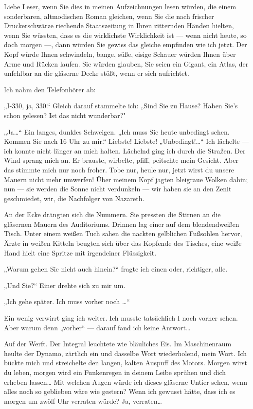 Liebe Leser, wenn Sie dies in meinen
Aufzeichnungen lesen würden, die einem sonderbaren, altmodischen
Roman gleichen, wenn Sie die nach frischer Druckerschwärze
riechende Staatszeitung in Ihren zitternden Händen hielten, wenn
Sie wüssten, dass es die wirklichste Wirklichkeit ist — wenn nicht
heute, so doch morgen —, dann würden Sie gewiss das gleiche
empfinden wie ich jetzt. Der Kopf würde Ihnen schwindeln, bange,
süße, eisige Schauer würden Ihnen über Arme und Rücken laufen. Sie
würden glauben, Sie seien ein Gigant, ein Atlas, der unfehlbar an
die gläserne Decke stößt, wenn er sich aufrichtet.

Ich nahm den Telefonhörer ab:

„I-330, ja, 330.“ Gleich darauf stammelte ich: „Sind Sie zu Hause?
Haben Sie's schon gelesen? Ist das nicht wunderbar?"

„Ja\ldots{}“ Ein langes, dunkles Schweigen. „Ich muss Sie heute
unbedingt sehen. Kommen Sie nach 16 Uhr zu mir.“ Liebste! Liebste!
„Unbedingt!\ldots{}“ Ich lächelte — ich konnte nicht länger an mich
halten. Lächelnd ging ich durch die Straßen. Der Wind sprang mich
an. Er brauste, wirbelte, pfiff, peitschte mein Gesicht. Aber das
stimmte mich nur noch froher. Tobe nur, heule nur, jetzt wirst du
unsere Mauern nicht mehr umwerfen! Über meinem Kopf jagten
bleigraue Wolken dahin; nun — sie werden
die Sonne nicht verdunkeln — wir haben sie an den Zenit
geschmiedet, wir, die Nachfolger von Nazareth.

An der Ecke drängten
sich die Nummern. Sie pressten die Stirnen an die gläsernen Mauern
des Auditoriums. Drinnen lag einer auf dem blendendweißen Tisch.
Unter einem weißen Tuch sahen die nackten gelblichen Fußsohlen
hervor, Ärzte in weißen Kitteln beugten sich über das Kopfende des
Tisches, eine weiße Hand hielt eine Spritze mit irgendeiner
Flüssigkeit.

„Warum gehen Sie nicht auch hinein?“ fragte ich einen oder,
richtiger, alle.

„Und Sie?“ Einer drehte sich zu mir um.

„Ich gehe später. Ich muss vorher noch \ldots{}“

Ein wenig verwirrt ging ich weiter. Ich musste
tatsächlich I noch vorher sehen. Aber warum denn „vorher“ — darauf
fand ich keine Antwort\ldots{}

Auf der Werft. Der Integral leuchtete wie bläuliches Eis. Im
Maschinenraum heulte der Dynamo, zärtlich ein und dasselbe Wort
wiederholend, mein Wort. Ich bückte mich und streichelte den
langen, kalten Auspuff des Motors. Morgen wirst du leben, morgen
wird ein Funkenregen in deinem Leibe sprühen und dich erheben
lassen\ldots{} Mit welchen Augen würde ich dieses gläserne Untier sehen,
wenn alles noch so geblieben wäre wie gestern? Wenn ich gewusst
hätte, dass ich es morgen um zwölf Uhr verraten würde? Ja,
verraten\ldots{}

